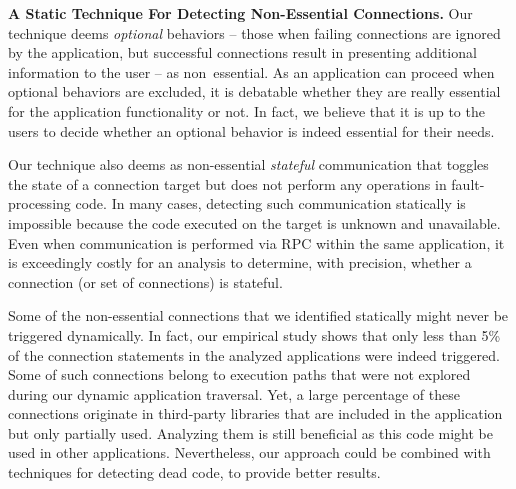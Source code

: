 \vspace{0.05in}
\noindent 
{\bf A Static Technique For Detecting Non-Essential Connections.}
Our technique deems \emph{optional} behaviors -- those when failing connections are ignored by the application, but successful connections result in presenting additional information to the user -- as non~essential. 
As an application can proceed when optional behaviors are excluded, it is debatable whether they are really essential for the application functionality or not. 
In fact, we believe that it is up to the users to decide whether an optional behavior is indeed essential for their needs. 

Our technique also deems as non-essential \emph{stateful} communication that toggles
the state of a connection target but does not perform any operations in
fault-processing code. In many cases, detecting such
communication statically is impossible because the code executed on
the target is unknown and unavailable.  Even when communication is
performed via RPC within the same application, it is exceedingly
costly for an analysis to determine, with precision, whether a
connection (or set of connections) is stateful. 
 
Some of the non-essential connections that we identified statically might never be triggered dynamically. In fact, our empirical study shows that only less than 5\% of the connection statements in the analyzed applications were indeed triggered.
Some of such connections belong to execution paths that were not explored during our dynamic application traversal.
Yet, a large percentage of these connections originate in  
third-party libraries that are included in the application but only partially used. 
Analyzing them is still beneficial as this code might be used in other applications.
Nevertheless, our approach could be combined with techniques for detecting dead code, to provide better results.

